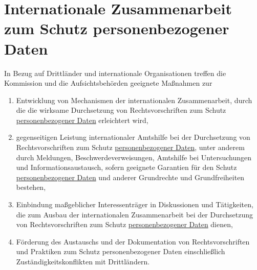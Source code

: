\chapter{Internationale Zusammenarbeit zum Schutz personenbezogener Daten}
\label{ch:50}


In Bezug auf Drittländer und internationale Organisationen treffen die Kommission und die Aufsichtsbehörden geeignete
Maßnahmen zur

\begin{enumerate}[label=\alph*)]
  
  \item Entwicklung von Mechanismen der internationalen Zusammenarbeit, durch die die wirksame Durchsetzung von
   Rechtsvorschriften zum Schutz \hyperref[itm:04-1]{personenbezogener Daten} erleichtert wird,
  \label{itm:50-a}

  \item gegenseitigen Leistung internationaler Amtshilfe bei der Durchsetzung von Rechtsvorschriften zum Schutz
   \hyperref[itm:04-1]{personenbezogener Daten}, unter anderem durch Meldungen, Beschwerdeverweisungen, Amtshilfe bei Untersuchungen und
   Informationsaustausch, sofern geeignete Garantien für den Schutz \hyperref[itm:04-1]{personenbezogener Daten} und anderer Grundrechte und
   Grundfreiheiten bestehen,
  \label{itm:50-b}

  \item Einbindung maßgeblicher Interessenträger in Diskussionen und Tätigkeiten, die zum Ausbau der internationalen
   Zusammenarbeit bei der Durchsetzung von Rechtsvorschriften zum Schutz \hyperref[itm:04-1]{personenbezogener Daten} dienen,
  \label{itm:50-c}

  \item Förderung des Austauschs und der Dokumentation von Rechtsvorschriften und Praktiken zum Schutz personenbezogener
   Daten einschließlich Zuständigkeitskonflikten mit Drittländern.
  \label{itm:50-d}

\end{enumerate}


